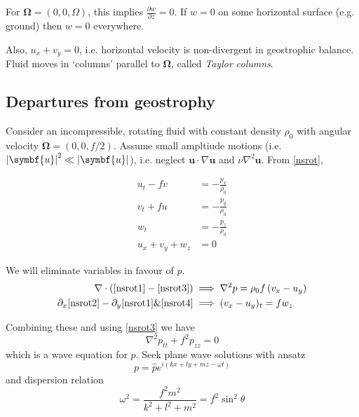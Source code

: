 \documentclass{jknotes}
\begin{document}
For $\symbf{\Omega} = (0, 0, \Omega)$, this implies $\frac{\partial w}{\partial
z} = 0$. If $w = 0$ on some horizontal surface (e.g. ground) then $w=0$
everywhere. 

Also, $u_x + v_y = 0$, i.e. horizontal velocity is non-divergent in
geostrophic balance. Fluid moves in `columns' parallel to $\symbf{\Omega}$,
called \emph{Taylor columns}.

\subsection{Departures from geostrophy}
Consider an incompressible, rotating fluid with constant density $\rho_0$ with
angular velocity $\symbf{\Omega} = (0, 0, f/2)$. Assume small ampltiude motions
(i.e. $\abs{\symbf{u}}^2 \ll \abs{\symbf{u}}$), i.e. neglect $\symbf{u}\cdot \nabla
\symbf{u}$ and $\nu \nabla^2 \symbf{u}$. From \eqref{nsrot},

\begin{align}
	u_t - fv &= -\frac{p_x}{\rho_0} \label{nsrot1} \\
	v_t + fu &= -\frac{p_y}{\rho_0} \label{nsrot2}\\
	w_t &= -\frac{p_z}{\rho_0} \label{nsrot3}\\
	u_x + v_y + w_z &= 0 \label{nsrot4}
\end{align}

We will eliminate variables in favour of $p$.
\begin{equation}
	\begin{aligned}
		\nabla \cdot \left( \eqref{nsrot1} - \eqref{nsrot3}\right) &\implies
\nabla^2 p = \rho_0 f\left(v_x - u_y\right) \\
\partial_x \eqref{nsrot2} - \partial_y \eqref{nsrot1} \& \eqref{nsrot4}
&\implies (v_x-u_y)_t = fw_z \\
\end{aligned}
\end{equation}

Combining these and using \eqref{nsrot3} we have
\begin{equation}
	\nabla^2 p_{tt} + f^2 p_{zz} = 0
\end{equation}
which is a wave equation for $p$. Seek plane wave solutions with ansatz 
\begin{equation}
	p = \hat{p}e^{i\left(kx + ly + mz-\omega t\right)}
\end{equation}
and dispersion relation
\begin{equation}
	\omega^2 = \frac{f^2 m^2}{k^2+l^2+m^2} = f^2 \sin^2 \theta
\end{equation}
\end{document}
